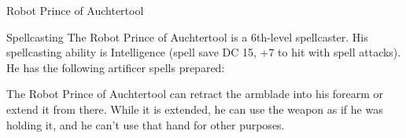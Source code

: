 \begin{DndMonster}[width=\textwidth + 8pt]{Robot Prince of Auchtertool}
\begin{multicols}{2}
		\DndMonsterAttack[
			name			= Lightning Launcher,
			distance		= ranged,	%
			mod				= +7,
			range			= 90/300,
			targets			= one target,
			dmg				= \DndDice{1d6 + 4},
			dmg-type		= Lightning,
			extra			= {. Once per turn the Robot Prince of Auchtertool can deal an additional \DndDice{1d6} Lightning damage to a target hit with this attack},
		]
		
	\begin{DndMonsterSpells}
		\item[Spellcasting] The Robot Prince of Auchtertool is a 6th-level spellcaster. His spellcasting ability is Intelligence (spell save DC 15, +7 to hit with spell attacks). He has the following artificer spells prepared:
	\end{DndMonsterSpells}
		
		The Robot Prince of Auchtertool can retract the armblade into his forearm or extend it from there. While it is extended, he can use the weapon as if he was holding it, and he can't use that hand for other purposes.
	\end{multicols}
\end{DndMonster}